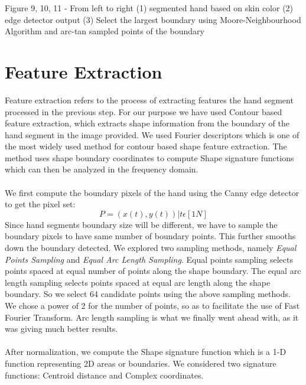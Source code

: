 \documentclass{acm} %
\begin{document}
Figure 9, 10, 11 - From left to right (1) segmented hand based on skin color (2) edge detector output (3) Select the largest boundary using Moore-Neighbourhood Algorithm and arc-tan sampled points of the boundary

\section{Feature Extraction}
Feature extraction refers to the process of extracting features the hand segment processed in the previous step. For our purpose we have used Contour based feature extraction, which extracts shape information from the boundary of the hand segment in the image provided. We used Fourier descriptors which is one of the most widely used method for contour based shape feature extraction. The method uses shape boundary coordinates to compute Shape signature functions which can then be analyzed in the frequency domain.\\
\\
We first compute the boundary pixels of the hand using the Canny edge detector to get the pixel set:
$$P = {(x(t) , y(t)) | t \epsilon [1 N]}$$
Since hand segments boundary size will be different, we have to sample the boundary pixels to have same number of boundary points. This further smooths down the boundary detected. We explored two sampling methods, namely \textit{Equal Points Sampling} and \textit{Equal Arc Length Sampling}. Equal points sampling selects points spaced at equal number of points along the shape boundary. The equal arc length sampling selects points spaced at equal arc length along the shape boundary. So we select 64 candidate points using the above sampling methods. We chose a power of 2 for the number of points, so as to facilitate the use of Fast Fourier Transform. Arc length sampling is what we finally went ahead with, as it was giving much better results.\\
\\
After normalization, we compute the Shape signature function which is a 1-D function representing 2D areas or boundaries. We considered two signature functions: Centroid distance and Complex coordinates.
\end{document}
